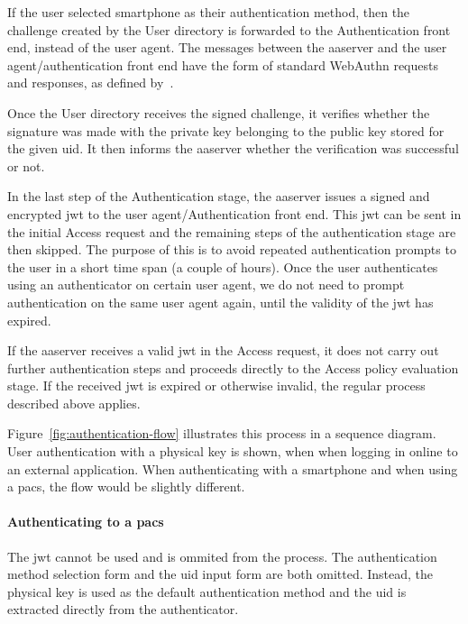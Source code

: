 If the user selected smartphone as their authentication method, then the challenge created by the User directory is forwarded to the Authentication front end, instead of the user agent. The messages between the \acrshort{aaserver} and the user agent/authentication front end have the form of standard WebAuthn requests and responses, as defined by~\cite{Balfanz2019Web1}. 

Once the User directory receives the signed challenge, it verifies whether the signature was made with the private key belonging to the public key stored for the given \acrshort{uid}. It then informs the \acrshort{aaserver} whether the verification was successful or not.

In the last step of the Authentication stage, the \acrshort{aaserver} issues a signed and encrypted \acrshort{jwt} to the user agent/Authentication front end. This \acrshort{jwt} can be sent in the initial Access request and the remaining steps of the authentication stage are then skipped. The purpose of this is to avoid repeated authentication prompts to the user in a short time span (a couple of hours). Once the user authenticates using an authenticator on certain user agent, we do not need to prompt authentication on the same user agent again, until the validity of the \acrshort{jwt} has expired.

If the \acrshort{aaserver} receives a valid \acrshort{jwt} in the Access request, it does not carry out further authentication steps and proceeds directly to the Access policy evaluation stage. If the received \acrshort{jwt} is expired or otherwise invalid, the regular process described above applies.

Figure~\ref{fig:authentication-flow} illustrates this process in a sequence diagram. User authentication with a physical key is shown, when when logging in online to an external application.
When authenticating with a smartphone and when using a \acrshort{pacs}, the flow would be slightly different.

\paragraph{Authenticating to a \acrshort{pacs}} 
The \acrshort{jwt} cannot be used and is ommited from the process. The authentication method selection form and the \acrshort{uid} input form are both omitted. Instead, the physical key is used as the default authentication method and the \acrshort{uid} is extracted directly from the authenticator.

